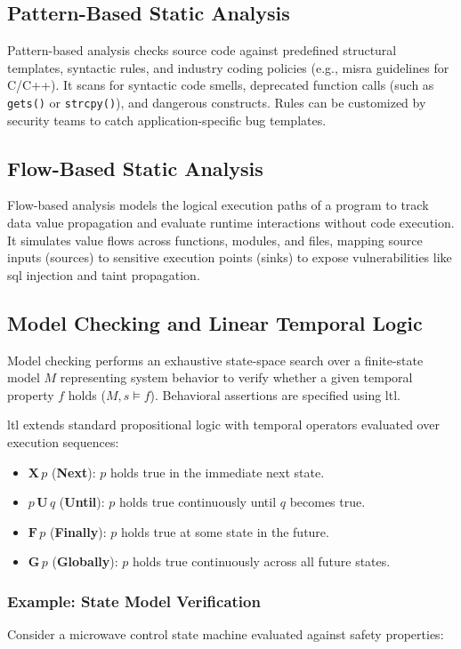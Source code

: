 \subsection{Pattern-Based Static Analysis}
Pattern-based analysis checks source code against predefined structural templates, syntactic rules, and industry coding policies (e.g., \gls{misra} guidelines for \textsf{C/C++}). It scans for syntactic code smells, deprecated function calls (such as \texttt{gets()} or \texttt{strcpy()}), and dangerous constructs. Rules can be customized by security teams to catch application-specific bug templates.

\subsection{Flow-Based Static Analysis}
Flow-based analysis models the logical execution paths of a program to track data value propagation and evaluate runtime interactions without code execution. It simulates value flows across functions, modules, and files, mapping source inputs (sources) to sensitive execution points (sinks) to expose vulnerabilities like \gls{sql} injection and taint propagation.

\subsection{Model Checking and Linear Temporal Logic}
Model checking performs an exhaustive state-space search over a finite-state model $M$ representing system behavior to verify whether a given temporal property $f$ holds ($M, s \models f$). Behavioral assertions are specified using \gls{ltl}.

\gls{ltl} extends standard propositional logic with temporal operators evaluated over execution sequences:
\begin{itemize}
    \item $\mathbf{X} \, p$ (\textbf{Next}): $p$ holds true in the immediate next state.
    \item $p \,\mathbf{U}\, q$ (\textbf{Until}): $p$ holds true continuously until $q$ becomes true.
    \item $\mathbf{F} \, p$ (\textbf{Finally}): $p$ holds true at some state in the future.
    \item $\mathbf{G} \, p$ (\textbf{Globally}): $p$ holds true continuously across all future states.
\end{itemize}

\subsubsection*{Example: State Model Verification}
Consider a microwave control state machine evaluated against safety properties:


